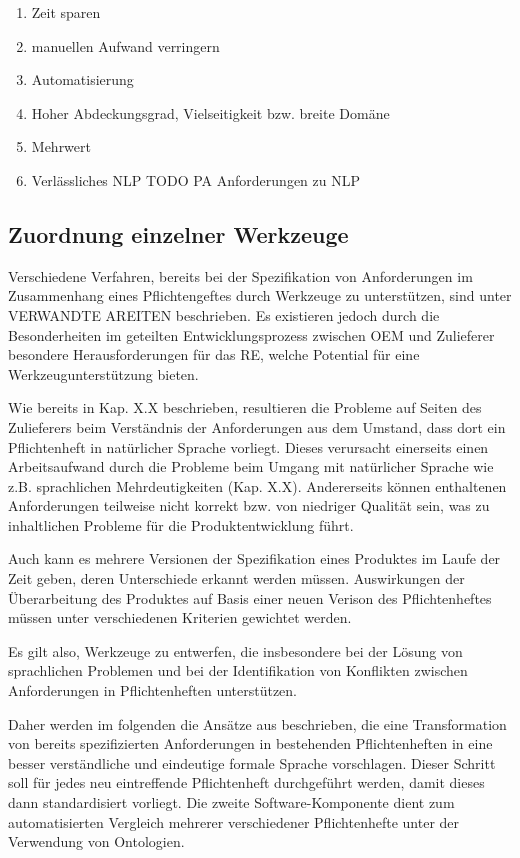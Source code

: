 \documentclass[12pt]{report}
\begin{document}
\begin{enumerate}
\item Zeit sparen
\item manuellen Aufwand verringern
\item Automatisierung 
\item Hoher Abdeckungsgrad, Vielseitigkeit bzw. breite Domäne
\item Mehrwert
\item Verlässliches NLP TODO PA Anforderungen zu NLP
\end{enumerate}
\subsection{Zuordnung einzelner Werkzeuge}
Verschiedene Verfahren, bereits bei der Spezifikation von Anforderungen im Zusammenhang eines Pflichtengeftes durch Werkzeuge zu unterstützen, sind unter VERWANDTE AREITEN beschrieben. Es existieren jedoch durch die Besonderheiten im geteilten Entwicklungsprozess zwischen OEM und Zulieferer besondere Herausforderungen für das RE, welche Potential für eine Werkzeugunterstützung bieten. 

Wie bereits in Kap. X.X beschrieben, resultieren die Probleme auf Seiten des Zulieferers beim Verständnis der Anforderungen aus dem Umstand, dass dort ein Pflichtenheft in natürlicher Sprache vorliegt. Dieses verursacht einerseits einen Arbeitsaufwand durch die Probleme beim Umgang mit natürlicher Sprache wie z.B. sprachlichen Mehrdeutigkeiten (Kap. X.X). Andererseits können enthaltenen Anforderungen teilweise nicht korrekt bzw. von niedriger Qualität sein, was zu inhaltlichen Probleme für die Produktentwicklung führt. 

Auch kann es mehrere Versionen der Spezifikation eines Produktes im Laufe der Zeit geben, deren Unterschiede erkannt werden müssen. Auswirkungen der Überarbeitung des Produktes auf Basis einer neuen Verison des Pflichtenheftes müssen unter verschiedenen Kriterien gewichtet werden. 

Es gilt also, Werkzeuge zu entwerfen, die insbesondere bei der Lösung von sprachlichen Problemen und bei der Identifikation von Konflikten zwischen Anforderungen in Pflichtenheften unterstützen. 

Daher werden im folgenden die Ansätze aus \cite{zh17} beschrieben, die eine Transformation von bereits spezifizierten Anforderungen in bestehenden Pflichtenheften in eine besser verständliche und eindeutige formale Sprache vorschlagen. Dieser Schritt soll für jedes neu eintreffende Pflichtenheft durchgeführt werden, damit dieses dann standardisiert vorliegt. Die zweite Software-Komponente dient zum automatisierten Vergleich mehrerer verschiedener Pflichtenhefte unter der Verwendung von Ontologien. 
\end{document}
